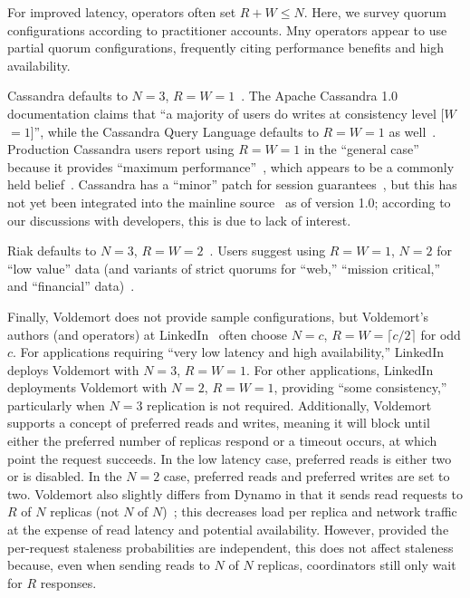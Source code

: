 \documentclass{vldb}
\begin{document}
For improved latency, operators often set $R+W \leq N$.  Here, we
survey quorum configurations according to practitioner accounts.  Mny
operators appear to use partial quorum configurations, frequently
citing performance benefits and high availability.

Cassandra defaults to $N$$=$$3$,
$R$$=$$W$$=$$1$~\cite{cassandradefault}. The Apache Cassandra 1.0
documentation claims that ``a majority of users do writes at
consistency level [$W$$=$$1$]'', while the Cassandra Query Language
defaults to $R$$=$$W$$=$$1$ as well~\cite{cassandra-docs}.  Production
Cassandra users report using $R$$=$$W$$=$$1$ in the ``general case''
because it provides ``maximum performance''~\cite{maxperfblog}, which
appears to be a commonly held belief~\cite{reddit, outbrain}.
Cassandra has a ``minor'' patch for session
guarantees~\cite{sessionguarantees}, but this has not yet been
integrated into the mainline source~\cite{cassandra-session} as of
version 1.0; according to our discussions with developers, this is due
to lack of interest.

Riak defaults to $N$$=$$3$, $R$$=$$W$$=$$2$~\cite{riakdefault-n,
  riakdefault-rw}. Users suggest using $R$$=$$W$$=$$1$, $N$$=$$2$ for
``low value'' data (and variants of strict quorums for ``web,''
``mission critical,'' and ``financial'' data)~\cite{riaktalkone,
  riaktalktwo}.

 Finally, Voldemort does not provide sample configurations, but
 Voldemort's authors (and operators) at LinkedIn~\cite{feinbergpc}
 often choose $N$$=$$c$, $R$$=$$W$$=$$ \lceil c/2 \rceil$ for odd $c$.
 For applications requiring ``very low latency and high
 availability,'' LinkedIn deploys Voldemort with $N$$=$$3$,
 $R$$=$$W$$=$$1$.  For other applications, LinkedIn deployments
 Voldemort with $N$$=$$2$, $R$$=$$W$$=$$1$, providing ``some
 consistency,'' particularly when $N$$=$$3$ replication is not
 required.  Additionally, Voldemort supports a concept of preferred
 reads and writes, meaning it will block until either the preferred
 number of replicas respond or a timeout occurs, at which point the
 request succeeds.  In the low latency case, preferred reads is either
 two or is disabled.  In the $N$$=$$2$ case, preferred reads and
 preferred writes are set to two.  Voldemort also slightly differs
 from Dynamo in that it sends read requests to $R$ of $N$ replicas
 (not $N$ of $N$)~\cite{voldemortpub}; this decreases load per replica
 and network traffic at the expense of read latency and potential
 availability.  However, provided the per-request staleness
 probabilities are independent, this does not affect staleness
 because, even when sending reads to $N$ of $N$ replicas, coordinators
 still only wait for $R$ responses.
\end{document}
